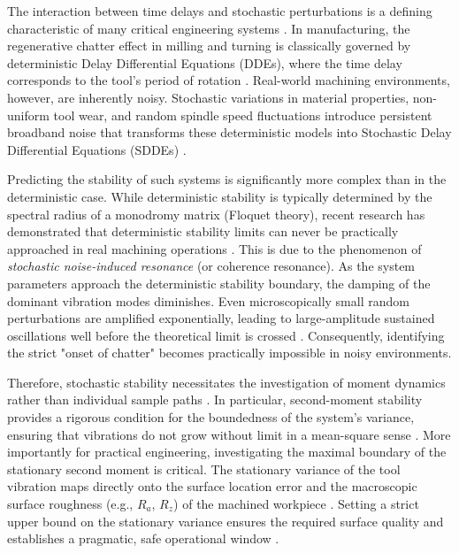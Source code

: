 \documentclass[preprint,12pt]{elsarticle}
\begin{document}
The interaction between time delays and stochastic perturbations is a defining characteristic of many critical engineering systems \cite{Stepan1989, Altintas2012, Tobias1965, Tlusty1954, Munoa2016, Quintana2011}. In manufacturing, the regenerative chatter effect in milling and turning is classically governed by deterministic Delay Differential Equations (DDEs), where the time delay corresponds to the tool's period of rotation \cite{Long2007, Dombovari2010, Fodor2020, Bakar2023, Ritto2020, Ren2021}. Real-world machining environments, however, are inherently noisy. Stochastic variations in material properties, non-uniform tool wear, and random spindle speed fluctuations introduce persistent broadband noise that transforms these deterministic models into Stochastic Delay Differential Equations (SDDEs) \cite{Long2007, Dombovari2010, Fodor2020, Bakar2023, Ritto2020, Ren2021}.

Predicting the stability of such systems is significantly more complex than in the deterministic case. While deterministic stability is typically determined by the spectral radius of a monodromy matrix (Floquet theory), recent research has demonstrated that deterministic stability limits can never be practically approached in real machining operations \cite{Sykora2021_MSSP}. This is due to the phenomenon of \textit{stochastic noise-induced resonance} (or coherence resonance). As the system parameters approach the deterministic stability boundary, the damping of the dominant vibration modes diminishes. Even microscopically small random perturbations are amplified exponentially, leading to large-amplitude sustained oscillations well before the theoretical limit is crossed \cite{Bachrathy2021_CIRP, Chen2023, Ma2019, Ding2022, Wang2024, Zhao2021, Yang2020}. Consequently, identifying the strict "onset of chatter" becomes practically impossible in noisy environments.

Therefore, stochastic stability necessitates the investigation of moment dynamics rather than individual sample paths \cite{Arnold1973, Khasminskii2011, Mao2007, Hasminskii1980, Bhattacharya1992, Bobrik1998, Grigoriu2002, Gao2021, Gao2023}. In particular, second-moment stability provides a rigorous condition for the boundedness of the system's variance, ensuring that vibrations do not grow without limit in a mean-square sense \cite{Higham2001, Kloeden1992, Buckwar2000, Baker2000, Ritto2013, Lee2020}. More importantly for practical engineering, investigating the maximal boundary of the stationary second moment is critical. The stationary variance of the tool vibration maps directly onto the surface location error and the macroscopic surface roughness (e.g., $R_a$, $R_z$) of the machined workpiece \cite{Zhou2021, Wang2021, Peng2023, Kim2019, Zhang2023, Li2023, Peng2020, Lee2020, Bakar2023, Kim2022}. Setting a strict upper bound on the stationary variance ensures the required surface quality and establishes a pragmatic, safe operational window \cite{Zhao2024, Wu2024, Liu2020, Yang2022, Sun2020, Guo2024, Sun2023, Ding2024, Wu2022, Lee2020, Guo2024, Peng2023}.
\end{document}

